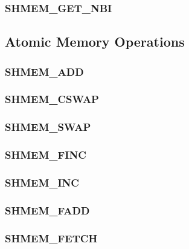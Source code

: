 \documentclass[10pt]{book}
\begin{document}
\subsubsection{\textbf{SHMEM\_GET\_NBI}}\label{subsec:shmem_get_nbi}



\subsection{Atomic Memory Operations}\label{sec:amo}


\subsubsection{\textbf{SHMEM\_ADD}}\label{subsec:shmem_add}


\subsubsection{\textbf{SHMEM\_CSWAP}}\label{subsec:shmem_cswap}
 

\subsubsection{\textbf{SHMEM\_SWAP}}\label{subsec:shmem_swap}


\subsubsection{\textbf{SHMEM\_FINC}}\label{subsec:shmem_finc}


\subsubsection{\textbf{SHMEM\_INC}}\label{subsec:shmem_inc}


\subsubsection{\textbf{SHMEM\_FADD}}\label{subsec:shmem_fadd}


\subsubsection{\textbf{SHMEM\_FETCH}}\label{subsec:shmem_fetch}

\end{document}
